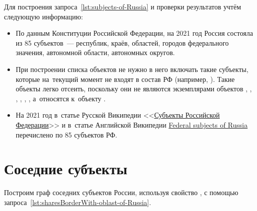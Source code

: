 Для построения запроса~\ref{lst:subjects-of-Russia} и проверки результатов учтём следующую информацию:
\begin{itemize}
  \item По данным Конституции Российской Федерации, на 2021 год Россия состояла из 85 субъектов~--- республик, краёв, областей, городов федерального значения, автономной области, автономных округов.
  \item При построении списка объектов не нужно в него включать такие субъекты, 
      которые на~текущий момент не входят в состав РФ (например, ). 
      Такие объекты легко отсеить, поскольку 
        они не являются экземплярами объектов , 
        , 
        , 
        , 
        , 
        , 
      а~относятся к~объекту . 
  \item На 2021 год в~статье Русской Википедии <<\href{https://ru.wikipedia.org/?curid=1042}{Субъекты Российской Федерации}>> 
        и в~статье Английской Википедии 
        \href{https://en.wikipedia.org/wiki/Federal_subjects_of_Russia}{Federal subjects of Russia} 
        перечислено по 85 субъектов РФ.
\end{itemize}





\section{Соседние субъекты}

Построим граф соседних субъектов России, используя свойство , 
с помощью запроса~\ref{lst:sharesBorderWith-oblast-of-Russia}.


